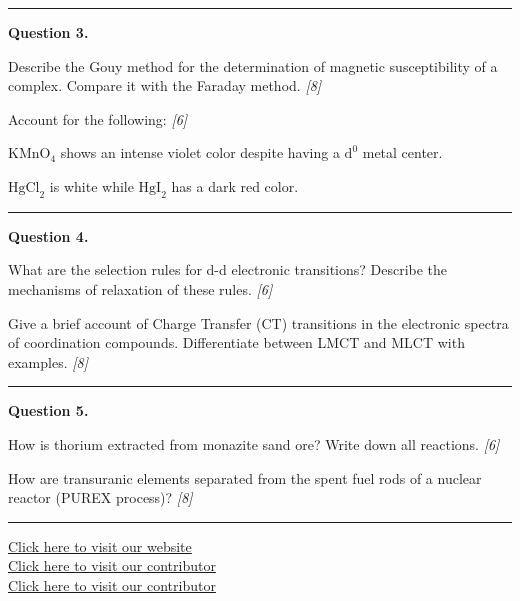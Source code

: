 \documentclass[11pt,a4paper]{article}
\newcommand{\pts}[1]{\hfill   \textit{[#1]}}
\begin{document}
\medskip\rule{\linewidth}{0.2pt}




\noindent   \textbf{Question 3.}

\begin{parts}
  \item Describe the Gouy method for the determination of magnetic susceptibility of a complex. Compare it with the Faraday method. \pts{8}
  \item Account for the following: \pts{6}
  
\begin{parts}
    \item $ \text{KMnO}_4$ shows an intense violet color despite having a $ \text{d}^0$ metal center.
    \item $ \text{HgCl}_2$ is white while $ \text{HgI}_2$ has a dark red color.
  \end{parts}
\end{parts}

\medskip\rule{\linewidth}{0.2pt}




\noindent   \textbf{Question 4.}

\begin{parts}
  \item What are the selection rules for d-d electronic transitions? Describe the mechanisms of relaxation of these rules. \pts{6}
  \item Give a brief account of Charge Transfer (CT) transitions in the electronic spectra of coordination compounds. Differentiate between LMCT and MLCT with examples. \pts{8}
\end{parts}

\medskip\rule{\linewidth}{0.2pt}




\noindent   \textbf{Question 5.}

\begin{parts}
  \item How is thorium extracted from monazite sand ore? Write down all reactions. \pts{6}
  \item How are transuranic elements separated from the spent fuel rods of a nuclear reactor (PUREX process)? \pts{8}
\end{parts}

\vfill
\rule{\linewidth}{0.4pt}

\begin{center}\small
  \href{https://bhu-exam.vercel.app/}{Click here to visit our website}\\[4pt]
  \href{https://me-aryan.vercel.app/}{Click here to visit our contributor}\\[4pt]
  \href{https://quashan-me.vercel.app/}{Click here to visit our contributor}
\end{center}
\end{document}
